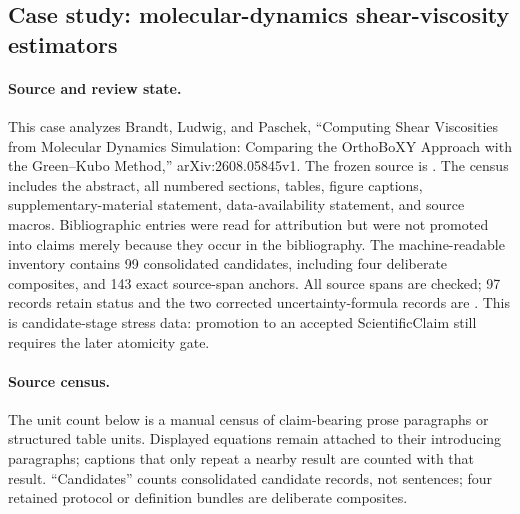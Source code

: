 \subsection{Case study: molecular-dynamics shear-viscosity estimators}\label{case:2608-05845}

\paragraph{Source and review state.}
This case analyzes Brandt, Ludwig, and Paschek, ``Computing Shear Viscosities from Molecular Dynamics Simulation: Comparing the OrthoBoXY Approach with the Green--Kubo Method,'' arXiv:2608.05845v1. The frozen source is . The census includes the abstract, all numbered sections, tables, figure captions, supplementary-material statement, data-availability statement, and source macros. Bibliographic entries were read for attribution but were not promoted into claims merely because they occur in the bibliography. The machine-readable inventory contains 99 consolidated candidates, including four deliberate composites, and 143 exact source-span anchors. All source spans are checked; 97 records retain  status and the two corrected uncertainty-formula records are . This is candidate-stage stress data: promotion to an accepted ScientificClaim still requires the later atomicity gate.

\paragraph{Source census.}
The unit count below is a manual census of claim-bearing prose paragraphs or structured table units. Displayed equations remain attached to their introducing paragraphs; captions that only repeat a nearby result are counted with that result. ``Candidates'' counts consolidated candidate records, not sentences; four retained protocol or definition bundles are deliberate composites.

